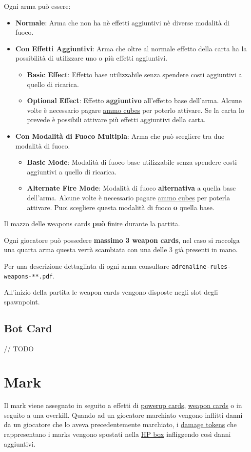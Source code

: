 \documentclass[a4paper, 12pt]{article}
\begin{document}
		Ogni arma può essere:
		\begin{itemize}
			\item \textbf{Normale}: Arma che non ha nè effetti aggiuntivi nè diverse modalità di fuoco.
			\item \textbf{Con Effetti Aggiuntivi}: Arma che oltre al normale effetto della carta ha la possibilità di utilizzare uno o più effetti aggiuntivi.
			\begin{itemize}
				\item \textbf{Basic Effect}: Effetto base utilizzabile senza spendere costi aggiuntivi a quello di ricarica.
				\item \textbf{Optional Effect}: Effetto \textbf{aggiuntivo} all'effetto base dell'arma. Alcune volte è necessario pagare \hyperref[sec:ammo-cubes]{ammo cubes} per poterlo attivare. Se la carta lo prevede è possibili attivare più effetti aggiuntivi della carta.
			\end{itemize}
			\item \textbf{Con Modalità di Fuoco Multipla}: Arma che può scegliere tra due modalità di fuoco.
			\begin{itemize}
				\item \textbf{Basic Mode}: Modalità di fuoco base utilizzabile senza spendere costi aggiuntivi a quello di ricarica.
				\item \textbf{Alternate Fire Mode}: Modalità di fuoco \textbf{alternativa} a quella base dell'arma. Alcune volte è necessario pagare \hyperref[sec:ammo-cubes]{ammo cubes} per poterla attivare. 
				Puoi scegliere questa modalità di fuoco \textbf{o} quella base.
			\end{itemize}
		\end{itemize}
	
		Il mazzo delle weapons cards \textbf{può} finire durante la partita.
		
		Ogni giocatore può possedere \textbf{massimo 3 weapon cards}, nel caso si raccolga una quarta arma questa verrà scambiata con una delle 3 già presenti in mano.
		
		Per una descrizione dettagliata di ogni arma consultare \texttt{adrenaline-rules-weapons-**.pdf}.
		
		All'inizio della partita le weapon cards vengono disposte negli slot degli spawnpoint. 
	\subsection{Bot Card}
		// TODO
\section{Mark} \label{sec:mark}
	Il mark viene assegnato in seguito a effetti di \hyperref[sec:powerup-cards]{powerup cards}, \hyperref[sec:weapon-cards]{weapon cards} o in seguito a una overkill.
	Quando ad un giocatore marchiato vengono inflitti danni da un giocatore che lo aveva precedentemente marchiato, i \hyperref[sec:damage-tokens]{damage tokens} che rappresentano i marks vengono spostati nella \hyperref[sec:hp-box]{HP box} infliggendo così danni aggiuntivi.
\end{document}
